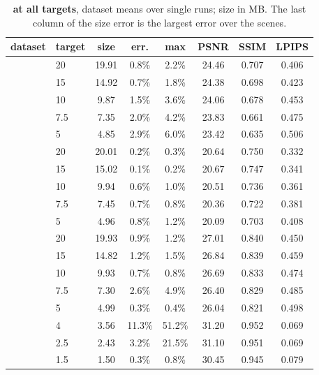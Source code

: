 \begin{table}[!htb]\centering\footnotesize
\caption{\textbf{\BM at all targets}, dataset means over single runs; size in MB. The last column of the size error is the largest error over the scenes.}
\label{sup:tab:targets}
\setlength{\tabcolsep}{3pt}
\begin{tabular}{@{}llcccccc@{}}
\toprule
dataset & target & size & err. & max & PSNR & SSIM & LPIPS \\
\midrule
{} & 20 & 19.91 & 0.8\% & 2.2\% & 24.46 & 0.707 & 0.406 \\
 & 15 & 14.92 & 0.7\% & 1.8\% & 24.38 & 0.698 & 0.423 \\
 & 10 & 9.87 & 1.5\% & 3.6\% & 24.06 & 0.678 & 0.453 \\
 & 7.5 & 7.35 & 2.0\% & 4.2\% & 23.83 & 0.661 & 0.475 \\
 & 5 & 4.85 & 2.9\% & 6.0\% & 23.42 & 0.635 & 0.506 \\
\midrule
{} & 20 & 20.01 & 0.2\% & 0.3\% & 20.64 & 0.750 & 0.332 \\
 & 15 & 15.02 & 0.1\% & 0.2\% & 20.67 & 0.747 & 0.341 \\
 & 10 & 9.94 & 0.6\% & 1.0\% & 20.51 & 0.736 & 0.361 \\
 & 7.5 & 7.45 & 0.7\% & 0.8\% & 20.36 & 0.722 & 0.381 \\
 & 5 & 4.96 & 0.8\% & 1.2\% & 20.09 & 0.703 & 0.408 \\
\midrule
{} & 20 & 19.93 & 0.9\% & 1.2\% & 27.01 & 0.840 & 0.450 \\
 & 15 & 14.82 & 1.2\% & 1.5\% & 26.84 & 0.839 & 0.459 \\
 & 10 & 9.93 & 0.7\% & 0.8\% & 26.69 & 0.833 & 0.474 \\
 & 7.5 & 7.30 & 2.6\% & 4.9\% & 26.40 & 0.829 & 0.485 \\
 & 5 & 4.99 & 0.3\% & 0.4\% & 26.04 & 0.821 & 0.498 \\
\midrule
{} & 4 & 3.56 & 11.3\% & 51.2\% & 31.20 & 0.952 & 0.069 \\
 & 2.5 & 2.43 & 3.2\% & 21.5\% & 31.10 & 0.951 & 0.069 \\
 & 1.5 & 1.50 & 0.3\% & 0.8\% & 30.45 & 0.945 & 0.079 \\
\bottomrule
\end{tabular}
\end{table}



